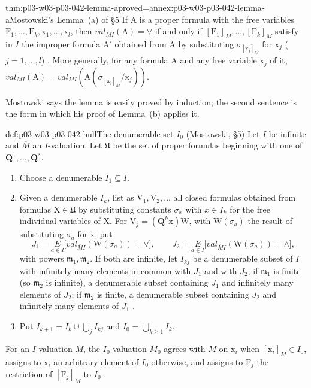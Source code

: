 \begin{hblemma}{thm:p03-w03-p03-042-lemma-a}{proved=annex:p03-w03-p03-042-lemma-a}{Mostowski's Lemma~(a) of \S5}
If \(\mathrm A\) is a proper formula with the free variables
\(\mathrm F_1,\ldots,\mathrm F_k,\mathrm x_1,\ldots,\mathrm x_l\), then
\(\mathit{val}_{MI}(\mathrm A)=\vee\) if and only if
\([\mathrm F_1]_M,\ldots,[\mathrm F_k]_M\) satisfy in \(I\) the improper
formula \(\mathrm A'\) obtained from \(\mathrm A\) by substituting
\(\sigma_{[\mathrm x_j]_M}\) for \(\mathrm x_j\) (\(j=1,\ldots,l\))
\cite[p.~21]{Mostowski1957}.  More generally, for any formula
\(\mathrm A\) and any free variable \(\mathrm x_j\) of it,
\(\mathit{val}_{MI}(\mathrm A)=\mathit{val}_{MI}(\mathrm A(\sigma_{[\mathrm
x_j]_M}/\mathrm x_j))\).
\end{hblemma}

Mostowski says the lemma is easily proved by induction; the second
sentence is the form in which his proof of Lemma~(b) applies it.

\begin{hbmethod}{def:p03-w03-p03-042-hull}{The denumerable set \(I_0\) (Mostowski, \S5)}
Let \(I\) be infinite and \(\overline M\) an \(I\)-valuation.  Let
\(\mathfrak U\) be the set of proper formulas beginning with one of
\(\mathbf Q^1,\ldots,\mathbf Q^s\).
\begin{enumerate}
\item Choose a denumerable \(I_1\subseteq I\).
\item Given a denumerable \(I_k\), list as \(\mathrm V_1,\mathrm
      V_2,\ldots\) all closed formulas obtained from formulas
      \(\mathrm X\in\mathfrak U\) by substituting constants \(\sigma_x\)
      with \(x\in I_k\) for the free individual variables of \(\mathrm X\).
      For \(\mathrm V_j=(\mathbf Q^h\mathrm x)\mathrm W\), with
      \(\mathrm W(\sigma_a)\) the result of substituting \(\sigma_a\) for
      \(\mathrm x\), put
      \[
       J_1=\underset{a\in I}{E}\bigl[\mathit{val}_{\overline MI}
       (\mathrm W(\sigma_a))=\vee\bigr],\qquad
       J_2=\underset{a\in I}{E}\bigl[\mathit{val}_{\overline MI}
       (\mathrm W(\sigma_a))=\wedge\bigr],
      \]
      with powers \(\mathfrak m_1,\mathfrak m_2\).  If both are infinite,
      let \(I_{kj}\) be a denumerable subset of \(I\) with infinitely many
      elements in common with \(J_1\) and with \(J_2\); if \(\mathfrak m_1\)
      is finite (so \(\mathfrak m_2\) is infinite), a denumerable subset
      containing \(J_1\) and infinitely many elements of \(J_2\); if
      \(\mathfrak m_2\) is finite, a denumerable subset containing \(J_2\)
      and infinitely many elements of \(J_1\)
      \cite[p.~21]{Mostowski1957}.
\item Put \(I_{k+1}=I_k\cup\bigcup_{j}I_{kj}\) and
      \(I_0=\bigcup_{k\geq1}I_k\).
\end{enumerate}
For an \(I\)-valuation \(M\), the \(I_0\)-valuation \(M_0\) agrees with
\(M\) on \(\mathrm x_i\) when \([\mathrm x_i]_M\in I_0\), assigns to
\(\mathrm x_i\) an arbitrary element of \(I_0\) otherwise, and assigns to
\(\mathrm F_j\) the restriction of \([\mathrm F_j]_M\) to \(I_0\)
\cite[p.~22]{Mostowski1957}.
\end{hbmethod}

